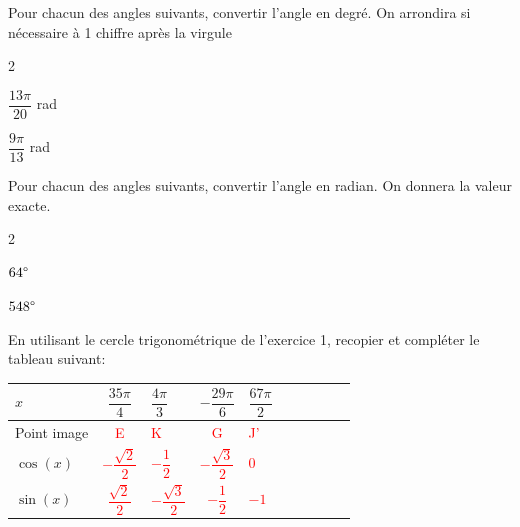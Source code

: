 \documentclass[11pt,a4paper]{article}  %
\begin{document}
Pour chacun des angles suivants, convertir l'angle en degré. On arrondira si nécessaire à 1 chiffre après la virgule
\begin{multicols}{2}
	\begin{enumMet}
		\item $\dfrac{13\pi}{20}$ rad \quad {}
		\item $\dfrac{9\pi}{13}$ rad \quad {}
	\end{enumMet}
\end{multicols}


Pour chacun des angles suivants, convertir l'angle en radian. On donnera la valeur exacte.
\begin{multicols}{2}
	\begin{enumMet}
		\item $64\degree$ \quad \corr{$=64\times \dfrac{\pi}{180}=\dfrac{16\pi}{45}$ rad}
		\item $548\degree$ \quad \corr{$=548\times \dfrac{\pi}{180}=\dfrac{137\pi}{45}$ rad}
	\end{enumMet}
\end{multicols}


En utilisant le cercle trigonométrique de l'exercice 1, recopier et compléter le tableau suivant:\\
\begin{center}
	\begin{tabular}{ | Xc | Xc | Xc | Xc | Xc | }
		\hline
		$x$  & $\dfrac{35\pi}{4}$ & $\dfrac{4\pi}{3}$ & $-\dfrac{29\pi}{6}$ &  $\dfrac{67\pi}{2}$ \rule[-12pt]{0pt}{33pt}\\ \hline
		Point image  & \textcolor{red}{E}  & \textcolor{red}{K}  & \textcolor{red}{G}  & \textcolor{red}{J'}  \rule[-12pt]{0pt}{33pt}\\ \hline
		$\cos(x)$  & \textcolor{red}{$-\dfrac{\sqrt{2}}{2}$}  & \textcolor{red}{$-\dfrac{1}{2}$}  & \textcolor{red}{$-\dfrac{\sqrt{3}}{2}$}  & \textcolor{red}{$0$}  \rule[-12pt]{0pt}{33pt}\\ \hline
		$\sin(x)$ & \textcolor{red}{$\dfrac{\sqrt{2}}{2}$}  & \textcolor{red}{$-\dfrac{\sqrt{3}}{2}$}  & \textcolor{red}{$-\dfrac{1}{2}$}  &  \textcolor{red}{$-1$} \rule[-12pt]{0pt}{33pt}\\
		\hline  
	\end{tabular}
\end{center}
\end{document}
